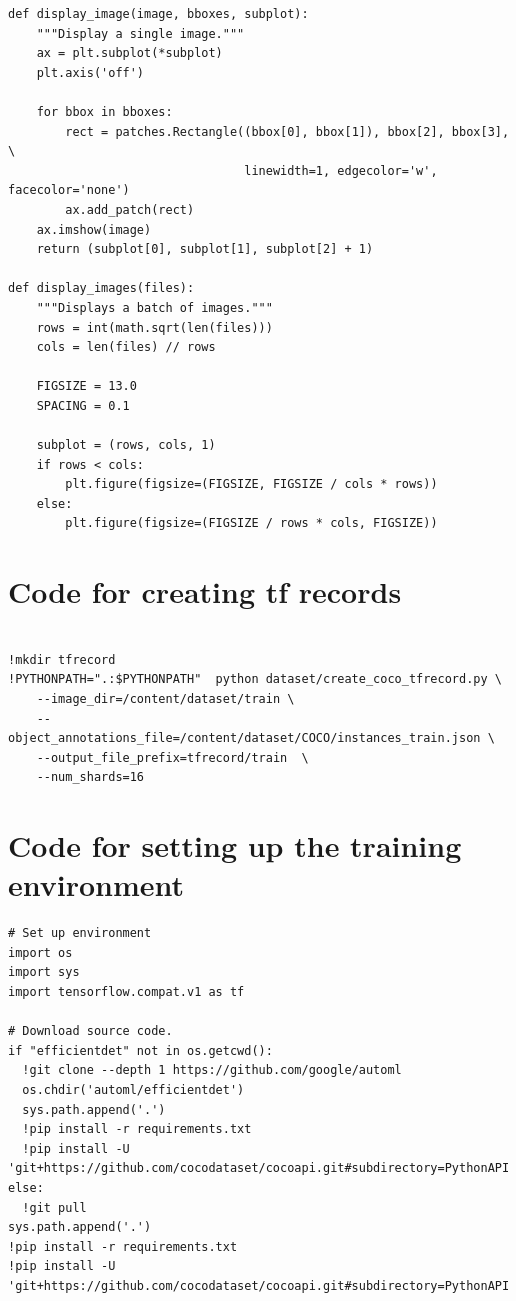\documentclass[12pt]{report}
\begin{document}
\begin{lstlisting}
def display_image(image, bboxes, subplot):
    """Display a single image."""
    ax = plt.subplot(*subplot)
    plt.axis('off')
    
    for bbox in bboxes:
        rect = patches.Rectangle((bbox[0], bbox[1]), bbox[2], bbox[3], \
                                 linewidth=1, edgecolor='w', facecolor='none')
        ax.add_patch(rect)
    ax.imshow(image)
    return (subplot[0], subplot[1], subplot[2] + 1)

def display_images(files):
    """Displays a batch of images."""
    rows = int(math.sqrt(len(files)))  
    cols = len(files) // rows
    
    FIGSIZE = 13.0
    SPACING = 0.1
    
    subplot = (rows, cols, 1)
    if rows < cols:
        plt.figure(figsize=(FIGSIZE, FIGSIZE / cols * rows))
    else:
        plt.figure(figsize=(FIGSIZE / rows * cols, FIGSIZE))
\end{lstlisting}

\section{Code for creating tf records}
\begin{lstlisting}

!mkdir tfrecord
!PYTHONPATH=".:$PYTHONPATH"  python dataset/create_coco_tfrecord.py \
    --image_dir=/content/dataset/train \
    --object_annotations_file=/content/dataset/COCO/instances_train.json \
    --output_file_prefix=tfrecord/train  \
    --num_shards=16
\end{lstlisting}

\section{Code for setting up the training environment}
\begin{lstlisting}
# Set up environment
import os
import sys
import tensorflow.compat.v1 as tf

# Download source code.
if "efficientdet" not in os.getcwd():
  !git clone --depth 1 https://github.com/google/automl
  os.chdir('automl/efficientdet')
  sys.path.append('.')
  !pip install -r requirements.txt
  !pip install -U 'git+https://github.com/cocodataset/cocoapi.git#subdirectory=PythonAPI'
else:
  !git pull
sys.path.append('.')
!pip install -r requirements.txt
!pip install -U 'git+https://github.com/cocodataset/cocoapi.git#subdirectory=PythonAPI'

\end{lstlisting}
\end{document}
